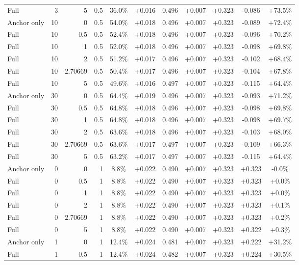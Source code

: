 \begin{table}[htbp]
\begin{tabular}{lrrrccccccc}
Full & 3 & 5 & 0.5 & 36.0\% & +0.016 & 0.496 & +0.007 & +0.323 & -0.086 & +73.5\% \\
Anchor only & 10 & 0 & 0.5 & 54.0\% & +0.018 & 0.496 & +0.007 & +0.323 & -0.089 & +72.4\% \\
Full & 10 & 0.5 & 0.5 & 52.4\% & +0.018 & 0.496 & +0.007 & +0.323 & -0.096 & +70.2\% \\
Full & 10 & 1 & 0.5 & 52.0\% & +0.018 & 0.496 & +0.007 & +0.323 & -0.098 & +69.8\% \\
Full & 10 & 2 & 0.5 & 51.2\% & +0.017 & 0.496 & +0.007 & +0.323 & -0.102 & +68.4\% \\
Full & 10 & 2.70669 & 0.5 & 50.4\% & +0.017 & 0.496 & +0.007 & +0.323 & -0.104 & +67.8\% \\
Full & 10 & 5 & 0.5 & 49.6\% & +0.016 & 0.497 & +0.007 & +0.323 & -0.115 & +64.4\% \\
Anchor only & 30 & 0 & 0.5 & 64.4\% & +0.019 & 0.496 & +0.007 & +0.323 & -0.093 & +71.2\% \\
Full & 30 & 0.5 & 0.5 & 64.8\% & +0.018 & 0.496 & +0.007 & +0.323 & -0.098 & +69.8\% \\
Full & 30 & 1 & 0.5 & 64.8\% & +0.018 & 0.496 & +0.007 & +0.323 & -0.098 & +69.7\% \\
Full & 30 & 2 & 0.5 & 63.6\% & +0.018 & 0.496 & +0.007 & +0.323 & -0.103 & +68.0\% \\
Full & 30 & 2.70669 & 0.5 & 63.6\% & +0.017 & 0.497 & +0.007 & +0.323 & -0.109 & +66.3\% \\
Full & 30 & 5 & 0.5 & 63.2\% & +0.017 & 0.497 & +0.007 & +0.323 & -0.115 & +64.4\% \\
Anchor only & 0 & 0 & 1 & 8.8\% & +0.022 & 0.490 & +0.007 & +0.323 & +0.323 & -0.0\% \\
Full & 0 & 0.5 & 1 & 8.8\% & +0.022 & 0.490 & +0.007 & +0.323 & +0.323 & +0.0\% \\
Full & 0 & 1 & 1 & 8.8\% & +0.022 & 0.490 & +0.007 & +0.323 & +0.323 & +0.0\% \\
Full & 0 & 2 & 1 & 8.8\% & +0.022 & 0.490 & +0.007 & +0.323 & +0.323 & +0.1\% \\
Full & 0 & 2.70669 & 1 & 8.8\% & +0.022 & 0.490 & +0.007 & +0.323 & +0.323 & +0.2\% \\
Full & 0 & 5 & 1 & 8.8\% & +0.022 & 0.490 & +0.007 & +0.323 & +0.322 & +0.3\% \\
Anchor only & 1 & 0 & 1 & 12.4\% & +0.024 & 0.481 & +0.007 & +0.323 & +0.222 & +31.2\% \\
Full & 1 & 0.5 & 1 & 12.4\% & +0.024 & 0.482 & +0.007 & +0.323 & +0.224 & +30.5\% \\

\end{tabular}
\end{table}
